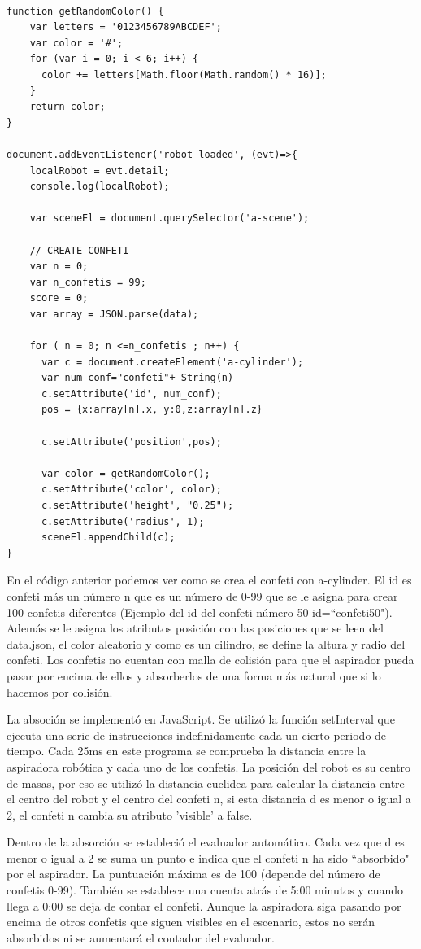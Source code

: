\begin{lstlisting}

function getRandomColor() {
    var letters = '0123456789ABCDEF';
    var color = '#';
    for (var i = 0; i < 6; i++) {
      color += letters[Math.floor(Math.random() * 16)];
    }
    return color;
}

document.addEventListener('robot-loaded', (evt)=>{
    localRobot = evt.detail;
    console.log(localRobot);

    var sceneEl = document.querySelector('a-scene');

    // CREATE CONFETI
    var n = 0;
    var n_confetis = 99;
    score = 0;
    var array = JSON.parse(data);

    for ( n = 0; n <=n_confetis ; n++) {
      var c = document.createElement('a-cylinder');
      var num_conf="confeti"+ String(n)
      c.setAttribute('id', num_conf);
      pos = {x:array[n].x, y:0,z:array[n].z}
    
      c.setAttribute('position',pos);
    
      var color = getRandomColor();
      c.setAttribute('color', color);
      c.setAttribute('height', "0.25");
      c.setAttribute('radius', 1);
      sceneEl.appendChild(c);
}
\end{lstlisting}

En el código anterior podemos ver como se crea el confeti  con  a-cylinder. El id es confeti más un número  n que es un número de 0-99 que se le asigna para crear 100 confetis diferentes (Ejemplo  del id del confeti número 50   id=``confeti50"). Además se le asigna los atributos posición con las posiciones que se leen del data.json, el color aleatorio y como es un cilindro, se define la altura y radio del confeti.
Los confetis no cuentan con malla de colisión para que  el aspirador pueda pasar por encima de ellos y absorberlos de una forma más natural que si lo hacemos por colisión.

La absoción se implementó en JavaScript. Se utilizó la función setInterval que  ejecuta una serie de instrucciones indefinidamente cada un cierto periodo de tiempo.
Cada 25ms en este programa se comprueba la distancia entre la aspiradora robótica y cada uno de los confetis. La posición del robot es su centro de masas, por eso se  utilizó la distancia euclidea para calcular la distancia entre el centro del robot y el centro del confeti n, si esta distancia d es menor o igual a 2, el confeti n cambia su atributo 'visible' a false. 


Dentro de la absorción se estableció el evaluador automático. Cada vez que d es menor o igual a 2 se suma un punto e indica que el confeti n ha sido  ``absorbido" por el aspirador. La puntuación máxima es de 100 (depende del número de confetis 0-99). También se establece una cuenta atrás de 5:00 minutos y cuando llega a 0:00 se deja de contar el confeti. Aunque la aspiradora siga pasando por encima de otros confetis que siguen visibles en el escenario, estos no serán absorbidos ni se aumentará el contador del evaluador.

